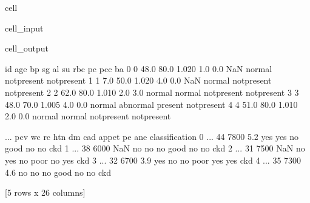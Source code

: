 \documentclass[letterpaper,10pt,french]{sphinxmanual}
\begin{document}
\begin{sphinxuseclass}{cell}
\begin{sphinxuseclass}{cell_input}
\begin{sphinxVerbatim}[commandchars=\\\{\}]
\end{sphinxVerbatim}

\end{sphinxuseclass}
\begin{sphinxuseclass}{cell_output}
\begin{sphinxVerbatim}[commandchars=\\\{\}]
   id   age    bp     sg   al   su     rbc        pc         pcc          ba  \PYGZbs{}
0   0  48.0  80.0  1.020  1.0  0.0     NaN    normal  notpresent  notpresent   
1   1   7.0  50.0  1.020  4.0  0.0     NaN    normal  notpresent  notpresent   
2   2  62.0  80.0  1.010  2.0  3.0  normal    normal  notpresent  notpresent   
3   3  48.0  70.0  1.005  4.0  0.0  normal  abnormal     present  notpresent   
4   4  51.0  80.0  1.010  2.0  0.0  normal    normal  notpresent  notpresent   

   ...  pcv    wc   rc  htn   dm  cad appet   pe  ane classification  
0  ...   44  7800  5.2  yes  yes   no  good   no   no            ckd  
1  ...   38  6000  NaN   no   no   no  good   no   no            ckd  
2  ...   31  7500  NaN   no  yes   no  poor   no  yes            ckd  
3  ...   32  6700  3.9  yes   no   no  poor  yes  yes            ckd  
4  ...   35  7300  4.6   no   no   no  good   no   no            ckd  

[5 rows x 26 columns]
\end{sphinxVerbatim}

\end{sphinxuseclass}
\end{sphinxuseclass}
\end{document}
